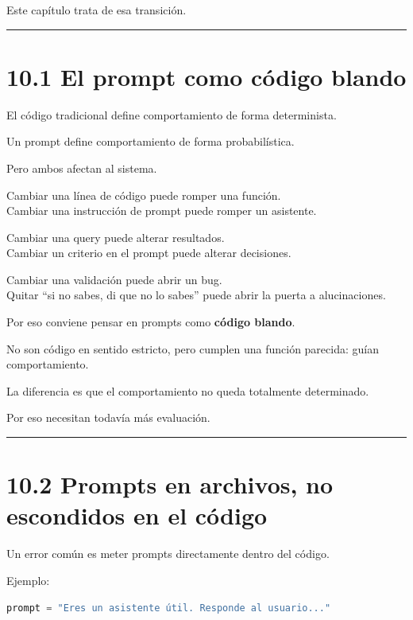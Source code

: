 Este capítulo trata de esa transición.

\begin{center}\rule{0.5\linewidth}{0.5pt}\end{center}

\section{10.1 El prompt como código
blando}\label{el-prompt-como-cuxf3digo-blando}

El código tradicional define comportamiento de forma determinista.

Un prompt define comportamiento de forma probabilística.

Pero ambos afectan al sistema.

Cambiar una línea de código puede romper una función.\\
Cambiar una instrucción de prompt puede romper un asistente.

Cambiar una query puede alterar resultados.\\
Cambiar un criterio en el prompt puede alterar decisiones.

Cambiar una validación puede abrir un bug.\\
Quitar ``si no sabes, di que no lo sabes'' puede abrir la puerta a
alucinaciones.

Por eso conviene pensar en prompts como \textbf{código blando}.

No son código en sentido estricto, pero cumplen una función parecida:
guían comportamiento.

La diferencia es que el comportamiento no queda totalmente determinado.

Por eso necesitan todavía más evaluación.

\begin{center}\rule{0.5\linewidth}{0.5pt}\end{center}

\section{10.2 Prompts en archivos, no escondidos en el
código}\label{prompts-en-archivos-no-escondidos-en-el-cuxf3digo}

Un error común es meter prompts directamente dentro del código.

Ejemplo:

\begin{lstlisting}[language=Python]
prompt = "Eres un asistente útil. Responde al usuario..."
\end{lstlisting}

